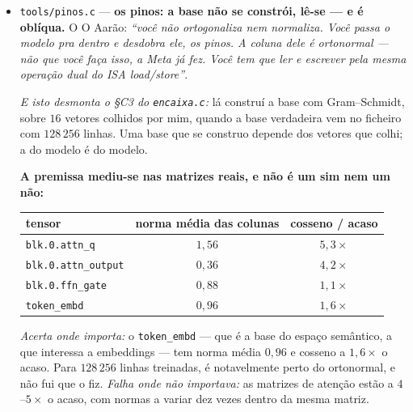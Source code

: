 \documentclass[11pt]{article}
\newcommand{\code}[1]{\texttt{\small #1}}
\theoremstyle{plain}
\theoremstyle{remark}
\begin{document}
\begin{itemize}
\textbf{E ela PRESERVA as distâncias} ($2{,}1\times10^{-15}$, que é Parseval) --- e é aqui que esta
cifra e o telómero se separam. Cada uma serve para o que a outra não serve: \emph{o telómero
espalha} (por isso identifica sem colidir) e \emph{esta preserva} (por isso procura). São o par
dual, e a busca precisa das duas.

\emph{Uma correção à premissa, medida:} ``só normalizar'' não bastava. Os vetores têm cosseno médio
$0{,}40$ entre pares, muito acima dos $0{,}036$ que o acaso daria em $768$ dimensões --- e isso não é
defeito, é o \textbf{significado}: \emph{rei} e \emph{rainha} não são ortogonais porque não são
independentes. Normalizar arruma o comprimento e não o ângulo; foi preciso ortogonalizar.

\item \code{tools/pinos.c} --- \textbf{os pinos: a base não se constrói, lê-se --- e é oblíqua.} O
O Aarão: \emph{``você não ortogonaliza nem normaliza. Você passa o modelo pra dentro e desdobra ele, os
pinos. A coluna dele é ortonormal --- não que você faça isso, a Meta já fez. Você tem que ler e
escrever pela mesma operação dual do ISA load/store''}.

\emph{E isto desmonta o §C3 do \code{encaixa.c}:} lá construí a base com Gram--Schmidt, sobre $16$
vetores colhidos por mim, quando a base verdadeira vem no ficheiro com $128\,256$ linhas. Uma base
que se construo depende dos vetores que colhi; a do modelo é do modelo.

\textbf{A premissa mediu-se nas matrizes reais, e não é um sim nem um não:}
\begin{center}\small
\begin{tabular}{lcc}
tensor & norma média das colunas & cosseno / acaso \\ \hline
\code{blk.0.attn\_q} & $1{,}56$ & $5{,}3\times$ \\
\code{blk.0.attn\_output} & $0{,}36$ & $4{,}2\times$ \\
\code{blk.0.ffn\_gate} & $0{,}88$ & $1{,}1\times$ \\
\code{token\_embd} & $0{,}96$ & $1{,}6\times$ \\
\end{tabular}
\end{center}

\emph{Acerta onde importa:} o \code{token\_embd} --- que é a base do espaço semântico, a que
interessa a embeddings --- tem norma média $0{,}96$ e cosseno a $1{,}6\times$ o acaso. Para
$128\,256$ linhas treinadas, é notavelmente perto do ortonormal, e não fui que o fiz.
\emph{Falha onde não importava:} as matrizes de atenção estão a $4$--$5\times$ o acaso, com normas a
variar dez vezes dentro da mesma matriz.


\end{itemize}
\end{document}
